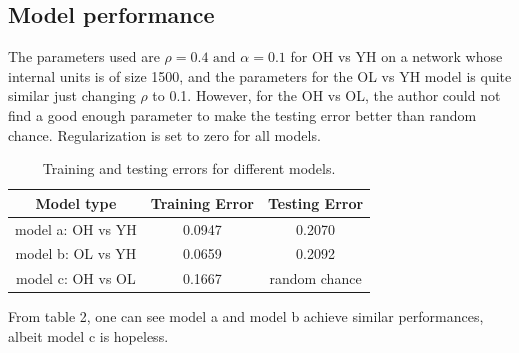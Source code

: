 \documentclass[a4paper,11pt,oneside]{article}
\begin{document}
\subsection{Model performance}

The parameters used are $\rho = 0.4 \text{ and } \alpha = 0.1 $ for OH vs YH on a network whose internal units is of size 1500, and the parameters for the OL vs YH model is quite similar just changing $\rho$ to 0.1. However, for the OH vs OL, the author could not find a good enough parameter to make the testing error better than random chance. Regularization is set to zero for all models. 
\begin{table}[h!]
	\centering
	\begin{tabular}{||c c c||} 
		\hline
		Model type & Training Error & Testing Error \\ [0.5ex] 
		\hline\hline
		model a: OH vs YH & 0.0947 & 0.2070 \\ 
		model b: OL vs YH & 0.0659 & 0.2092  \\
		model c: OH vs OL & 0.1667 & random chance  \\ [0.5ex] 
		\hline
	\end{tabular}
\caption{Training and testing errors for different models.}
\end{table}

From table 2, one can see model a and model b achieve similar performances, albeit model c is hopeless. 
\end{document}
